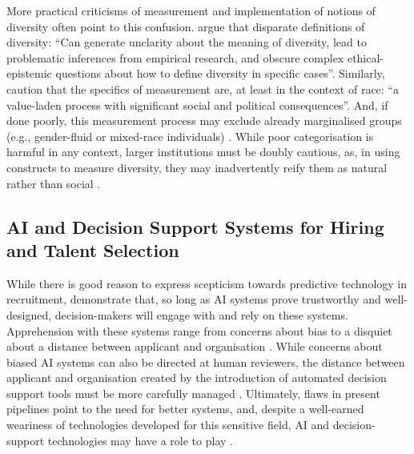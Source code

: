 More practical criticisms of measurement and implementation of notions of diversity often point to this confusion. \textcite{steel_multiple_2018} argue that disparate definitions of diversity: ``Can generate unclarity about the meaning of diversity, lead to problematic inferences from empirical research, and obscure complex ethical-epistemic questions about how to define diversity in specific cases''. Similarly, \textcite{abdu2023empirical} caution that the specifics of measurement are, at least in the context of race: ``a value-laden process with significant social and political consequences''. And, if done poorly, this measurement process may exclude already marginalised groups (e.g., gender-fluid or mixed-race individuals) \cite{scheuerman2019computers}. While poor categorisation is harmful in any context, larger institutions must be doubly cautious, as, in using constructs to measure diversity, they may inadvertently reify them as natural rather than social \cite{scheuerman2021auto}. 

\subsection{AI and Decision Support Systems for Hiring and Talent Selection}
While there is good reason to express scepticism towards predictive technology in recruitment, \textcite{Vereschak_Alizadeh_Bailly_Caramiaux_2024} demonstrate that, so long as AI systems prove trustworthy and well-designed, decision-makers will engage with and rely on these systems. Apprehension with these systems range from concerns about bias to a disquiet about a distance between applicant and organisation \cite{Lashkari_Cheng_2023}. While concerns about biased AI systems can also be directed at human reviewers, the distance between applicant and organisation created by the introduction of automated decision support tools must be more carefully managed \cite{Leung_Zhang_Jibuti_Zhao_Klein_Pierce_Robert_Zhu_2020,Lashkari_Cheng_2023}. Ultimately, flaws in present pipelines point to the need for better systems, and, despite a well-earned weariness of technologies developed for this sensitive field, AI and decision-support technologies may have a role to play \cite{kleinberg2018algorithmic,Vereschak_Alizadeh_Bailly_Caramiaux_2024,barocas2023fairness,huppenkothen2020entrofy,schumann2017diverse}.

